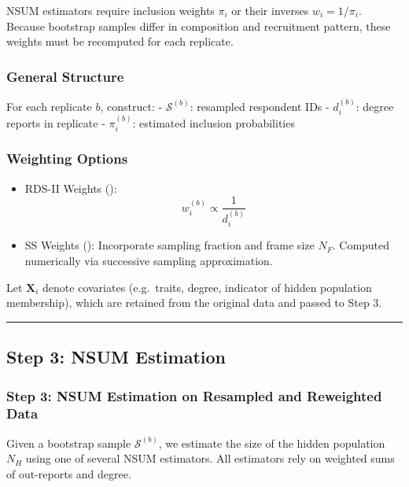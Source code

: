 \documentclass[
  12pt,
  letterpaper,
  DIV=11,
  numbers=noendperiod]{scrartcl}
\theoremstyle{plain}
\theoremstyle{definition}
\begin{document}
NSUM estimators require inclusion weights \(\pi_i\) or their inverses
\(w_i = 1 / \pi_i\). Because bootstrap samples differ in composition and
recruitment pattern, these weights must be recomputed for each
replicate.

\subsubsection{General Structure}\label{general-structure}

For each replicate \(b\), construct: - \(\mathcal{S}^{(b)}\): resampled
respondent IDs - \(d_i^{(b)}\): degree reports in replicate -
\(\pi_i^{(b)}\): estimated inclusion probabilities

\subsubsection{Weighting Options}\label{weighting-options}

\begin{itemize}
\item
  RDS-II Weights (\textcite{volz08-simple}): \[
  w_i^{(b)} \propto \frac{1}{d_i^{(b)}}
  \]
\item
  SS Weights (\textcite{gile11-improv}): Incorporate sampling fraction
  and frame size \(N_F\). Computed numerically via successive sampling
  approximation.
\end{itemize}

Let \(\mathbf{X}_i\) denote covariates (e.g.~traits, degree, indicator
of hidden population membership), which are retained from the original
data and passed to Step 3.

\begin{center}\rule{0.5\linewidth}{0.5pt}\end{center}

\subsection{Step 3: NSUM Estimation}\label{step-3-nsum-estimation}

\subsubsection{Step 3: NSUM Estimation on Resampled and Reweighted
Data}\label{step-3-nsum-estimation-on-resampled-and-reweighted-data}

Given a bootstrap sample \(\mathcal{S}^{(b)}\), we estimate the size of
the hidden population \(N_H\) using one of several NSUM estimators. All
estimators rely on weighted sums of out-reports and degree.
\end{document}
